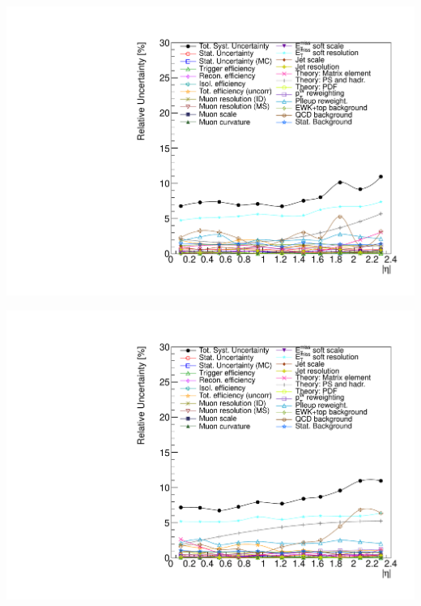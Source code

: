 {
\colb[T]
\centering
{}
\includegraphics[width=1.0\textwidth]{dates/20130602/figures/v26.allqcd/Wmn_SYSTEM30_2D_PT20_NEG_Unc_2d_Slice_1}

\centering
{}
\includegraphics[width=1.0\textwidth]{dates/20130602/figures/v26.allqcd/Wmn_SYSTEM30_2D_PT20_POS_Unc_2d_Slice_1}
\cole
}


